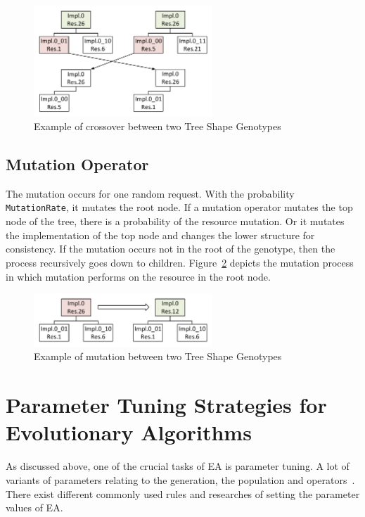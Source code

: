 \begin{figure}
	\centering
	\includegraphics[width=0.6\textwidth]{images/GeneticSolverCrossover.pdf}
	\caption[Crossover in Tree Shape Genotype]{Example of crossover between two Tree Shape Genotypes}
	\label{fig:GeneticSolverCrossover}
\end{figure}



\subsection{Mutation Operator}
\label{sec:GeneticSolverMutation}
The mutation occurs for one random request. With the probability \texttt{MutationRate}, it mutates the root node. If a mutation operator mutates the top node of the tree, there is a probability of the resource mutation. Or it mutates the implementation of the top node and changes the lower structure for consistency. If the mutation occurs not in the root of the genotype, then the process recursively goes down to children.  Figure~\ref{fig:GeneticSolverMutation} depicts the mutation process in which mutation performs on the resource in the root node.

\begin{figure}
	\centering
	\includegraphics[width=0.6\textwidth]{images/GeneticSolverMutation.pdf}
	\caption[Mutation in Tree Shape Genotype]{Example of mutation between two Tree Shape Genotypes}
	\label{fig:GeneticSolverMutation}
\end{figure}

\section{Parameter Tuning Strategies for Evolutionary Algorithms}\label{sec:Parameter Tuning Strategies}
As discussed above, one of the crucial tasks of EA is parameter tuning. A lot of variants of parameters relating to the generation, the population and operators~\cite{sipper2018investigating}. There exist different commonly used rules and researches of setting the parameter values of EA.

